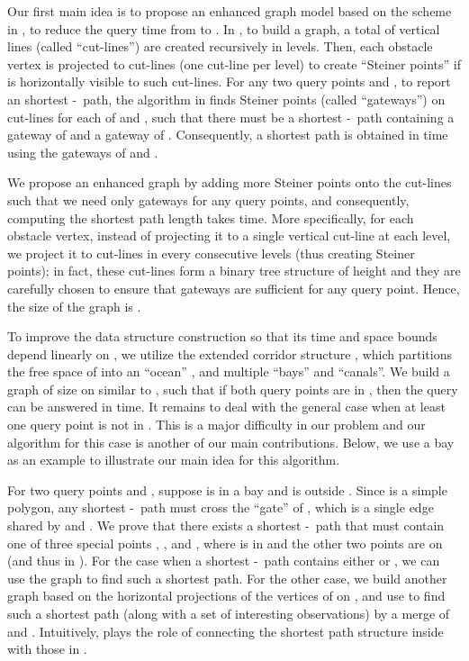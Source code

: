 \documentclass[english,runningheads,11pt]{llncs}
\def\st{-}
\begin{document}
Our first main idea is to propose an enhanced graph model based on the
scheme in \cite{ref:ChenSh00,ref:ClarksonRe87,ref:ClarksonRe88}, to reduce the query
time from  to . In \cite{ref:ChenSh00,ref:ClarksonRe87,ref:ClarksonRe88},
to build a graph, a total of  vertical lines (called ``cut-lines'') are created recursively in  levels.
Then, each obstacle vertex  is projected to  cut-lines (one cut-line per level) to create ``Steiner points'' if  is horizontally visible to such cut-lines.
For any two query points  and , to report an  shortest \st\ path, the algorithm in \cite{ref:ChenSh00} finds  Steiner points (called ``gateways'') on  cut-lines for each of  and , such that there must be a shortest \st\ path containing a gateway of  and a gateway of . Consequently, a shortest path is obtained in  time using the  gateways of  and .


We propose an enhanced
graph  by adding more Steiner points onto the cut-lines such that
we need only  gateways for any query points,
and consequently, computing the shortest path length takes  time. More
specifically, for each obstacle vertex, instead of projecting it to a single vertical
cut-line at each level, we project it to  cut-lines in
every 
consecutive levels (thus creating  Steiner points); in fact,
these cut-lines form a binary tree structure of height  and they are carefully chosen to ensure that  gateways are sufficient for any query point.
Hence, the size
of the graph  is .


To improve the data structure construction so that its time and space bounds
depend linearly on , we utilize the extended corridor
structure \cite{ref:ChenA11ESA,ref:ChenCo12arXiv,ref:ChenL113STACS},
which partitions the free space of  into an ``ocean'' , and
multiple ``bays'' and ``canals''. We build a graph 
of size  on  similar to ,
such that if both query points are in , then the query can be answered in
 time. It remains to deal with the general case when at least one query
point is not in . This is a major difficulty in our problem and our algorithm for
this case is another of our main contributions. Below, we use a bay as an example to
illustrate our main idea for this algorithm.

For two query points  and , suppose  is in a bay  and  is outside .
Since  is a simple polygon, any shortest \st\ path must cross the ``gate''  of ,
which is a single edge shared by  and . We prove that there exists a shortest
\st\ path that must contain one of three special points ,
, and , where  is in  and the other
two points are on  (and thus in ). For the case
when a shortest \st\ path contains either  or ,
we can use the graph  to find such a shortest
path. For the other case, we build another graph  based on the
horizontal projections of the vertices of  on , and use  to find
such a shortest path (along with a set of interesting observations) by a merge of
 and . Intuitively,  plays the role of connecting the shortest
path structure inside  with those in .
\end{document}
